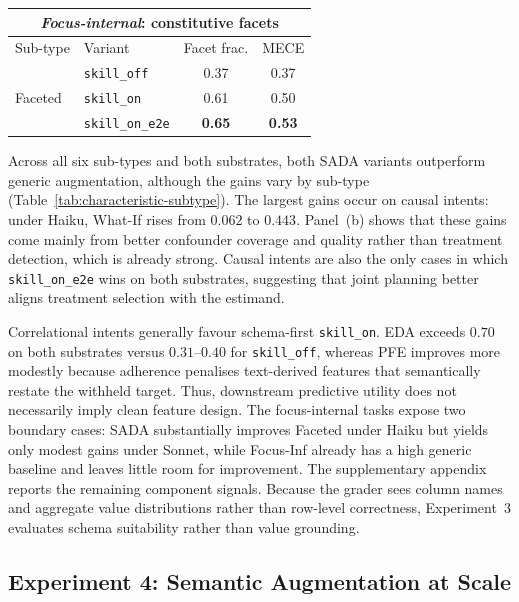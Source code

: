 \begin{table}[t]
\vspace{4pt}

\begin{tabular}{llcc}
\multicolumn{4}{c}{\textit{Focus-internal}: constitutive facets} \\
\toprule
Sub-type & Variant & Facet frac. & MECE \\
\midrule
\multirow{3}{*}{\textsf{Faceted}}
 & \texttt{skill\_off}     & 0.37 & 0.37 \\
 & \texttt{skill\_on}      & 0.61 & 0.50 \\
 & \texttt{skill\_on\_e2e} & \textbf{0.65} & \textbf{0.53} \\
\bottomrule
\end{tabular}
\end{table}
\fi  %

Across all six sub-types and both substrates, both SADA variants outperform generic augmentation, although the gains vary by sub-type (Table~\ref{tab:characteristic-subtype}). The largest gains occur on causal intents: under Haiku, \textsf{What-If} rises from $0.062$ to $0.443$. Panel~(b) shows that these gains come mainly from better confounder coverage and quality rather than treatment detection, which is already strong. Causal intents are also the only cases in which \texttt{skill\_on\_e2e} wins on both substrates, suggesting that joint planning better aligns treatment selection with the estimand.

Correlational intents generally favour schema-first \texttt{skill\_on}. \textsf{EDA} exceeds $0.70$ on both substrates versus $0.31$--$0.40$ for \texttt{skill\_off}, whereas \textsf{PFE} improves more modestly because adherence penalises text-derived features that semantically restate the withheld target. Thus, downstream predictive utility does not necessarily imply clean feature design. The focus-internal tasks expose two boundary cases: SADA substantially improves \textsf{Faceted} under Haiku but yields only modest gains under Sonnet, while \textsf{Focus-Inf} already has a high generic baseline and leaves little room for improvement. The supplementary appendix reports the remaining component signals. Because the grader sees column names and aggregate value distributions rather than row-level correctness, Experiment~3 evaluates schema suitability rather than value grounding.

\subsection{Experiment 4: Semantic Augmentation at Scale}
\label{subsec:exp-scale}

